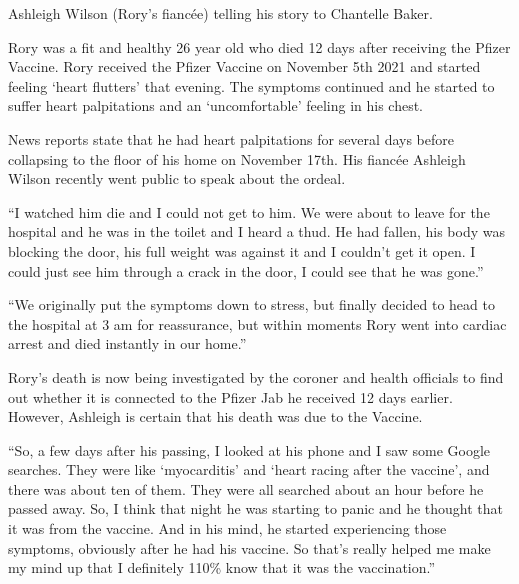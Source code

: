 Ashleigh Wilson (Rory’s fiancée) telling his story to Chantelle Baker.

Rory was a fit and healthy 26 year old who died 12 days after receiving the
Pfizer Vaccine. Rory received the Pfizer Vaccine on November 5th 2021 and
started feeling ‘heart flutters’ that evening. The symptoms continued and he
started to suffer heart palpitations and an ‘uncomfortable’ feeling in his
chest.

News reports state that he had heart palpitations for several days before
collapsing to the floor of his home on November 17th. His fiancée Ashleigh
Wilson recently went public to speak about the ordeal.

“I watched him die and I could not get to him. We were about to leave for the
hospital and he was in the toilet and I heard a thud. He had fallen, his body
was blocking the door, his full weight was against it and I couldn’t get it
open. I could just see him through a crack in the door, I could see that he was
gone.”

“We originally put the symptoms down to stress, but finally decided to head to
the hospital at 3 am for reassurance, but within moments Rory went into cardiac
arrest and died instantly in our home.”

Rory’s death is now being investigated by the coroner and health officials to
find out whether it is connected to the Pfizer Jab he received 12 days
earlier. However, Ashleigh is certain that his death was due to the Vaccine.

“So, a few days after his passing, I looked at his phone and I saw some Google
searches. They were like ‘myocarditis’ and ‘heart racing after the vaccine’, and
there was about ten of them. They were all searched about an hour before he
passed away. So, I think that night he was starting to panic and he thought that
it was from the vaccine. And in his mind, he started experiencing those
symptoms, obviously after he had his vaccine. So that’s really helped me make my
mind up that I definitely 110\% know that it was the vaccination.”

